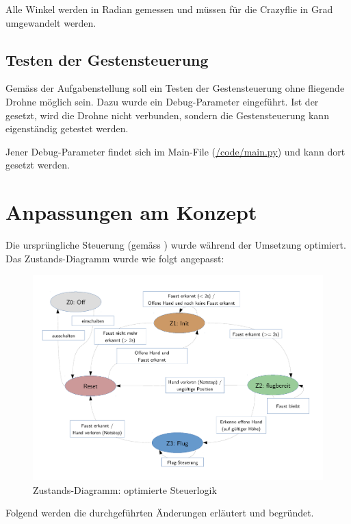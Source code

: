 Alle Winkel werden in Radian gemessen und müssen für die Crazyflie in Grad umgewandelt werden.

\subsection{Testen der Gestensteuerung}
Gemäss der Aufgabenstellung soll ein Testen der Gestensteuerung ohne fliegende Drohne möglich sein.
Dazu wurde ein Debug-Parameter eingeführt.
Ist der gesetzt, wird die Drohne nicht verbunden, sondern die Gestensteuerung kann eigenständig getestet werden.

Jener Debug-Parameter findet sich im Main-File (\href{https://github.com/MrJack91/droneGestures/blob/master/code/main.py}{/code/main.py}) und kann dort gesetzt werden.



\section{Anpassungen am Konzept}
\label{sec:poc:conceptChanges}
Die ursprüngliche Steuerung (gemäss ) wurde während der Umsetzung optimiert.\\
Das Zustands-Diagramm wurde wie folgt angepasst:
\begin{figure}[H]
	\centering
	\includegraphics[width=1.0\textwidth]{figures/concept/state-diagram-2.pdf}
	\caption{Zustands-Diagramm: optimierte Steuerlogik}
\end{figure}

Folgend werden die durchgeführten Änderungen erläutert und begründet.

